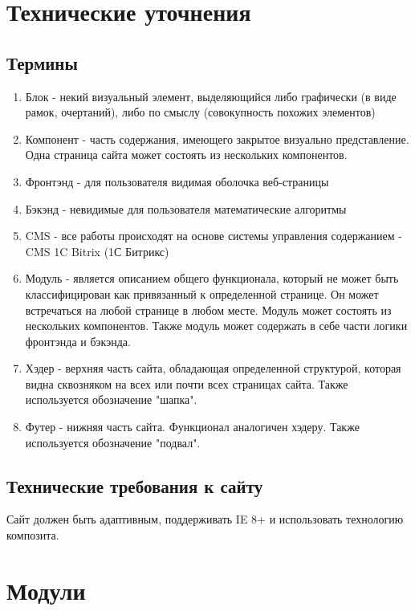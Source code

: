 \documentclass[DIV=calc, paper=a4, fontsize=11pt]{scrartcl} %
\begin{document}
\section{Технические уточнения}

\subsection{Термины}
    \begin{enumerate}
        \item Блок - некий визуальный элемент, выделяющийся либо графически (в виде рамок, очертаний), либо по смыслу (совокупность похожих элементов)
        \item Компонент - часть содержания, имеющего закрытое визуально представление. Одна страница сайта может состоять из нескольких компонентов.
        \item Фронтэнд - для пользователя видимая оболочка веб-страницы
        \item Бэкэнд - невидимые для пользователя математические алгоритмы
        \item CMS - все работы происходят на основе системы управления содержанием - CMS 1C Bitrix (1С Битрикс)
        \item Модуль - является описанием общего функционала, который не может быть классифицирован как привязанный к определенной странице. Он может встречаться на любой странице в любом месте. Модуль может состоять из нескольких компонентов. Также модуль может содержать в себе части логики фронтэнда и бэкэнда.
        \item Хэдер - верхняя часть сайта, обладающая определенной структурой, которая видна сквозняком на всех или почти всех страницах сайта. Также используется обозначение "шапка".
        \item Футер - нижняя часть сайта. Функционал аналогичен хэдеру. Также используется обозначение "подвал".
    \end{enumerate}


\subsection{Технические требования к сайту}
Сайт должен быть адаптивным, поддерживать IE 8+ и использовать технологию композита.


\section{Модули}
\end{document}
